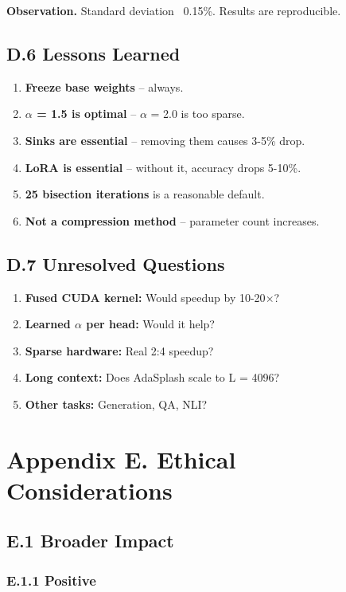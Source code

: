 \textbf{Observation.} Standard deviation ~0.15\%. Results are reproducible.

\subsection{D.6 Lessons Learned}

\begin{enumerate}
\item \textbf{Freeze base weights} -- always.
\item \textbf{$\alpha$ = 1.5 is optimal} -- $\alpha$ = 2.0 is too sparse.
\item \textbf{Sinks are essential} -- removing them causes 3-5\% drop.
\item \textbf{LoRA is essential} -- without it, accuracy drops 5-10\%.
\item \textbf{25 bisection iterations} is a reasonable default.
\item \textbf{Not a compression method} -- parameter count increases.

\end{enumerate}
\subsection{D.7 Unresolved Questions}

\begin{enumerate}
\item \textbf{Fused CUDA kernel:} Would speedup by 10-20$\times$?
\item \textbf{Learned $\alpha$ per head:} Would it help?
\item \textbf{Sparse hardware:} Real 2:4 speedup?
\item \textbf{Long context:} Does AdaSplash scale to L = 4096?
\item \textbf{Other tasks:} Generation, QA, NLI?
\end{enumerate}


\section{Appendix E. Ethical Considerations}

\subsection{E.1 Broader Impact}

\subsubsection{E.1.1 Positive}

